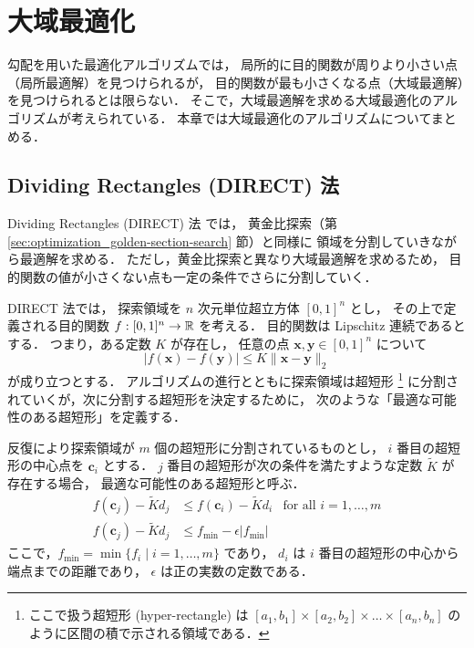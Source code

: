 %

\chapter{大域最適化}

勾配を用いた最適化アルゴリズムでは，
局所的に目的関数が周りより小さい点（局所最適解）を見つけられるが，
目的関数が最も小さくなる点（大域最適解）を見つけられるとは限らない．
そこで，大域最適解を求める大域最適化のアルゴリズムが考えられている．
本章では大域最適化のアルゴリズムについてまとめる．

\section{Dividing Rectangles (DIRECT) 法}\label{sec:optimization_direct}

Dividing Rectangles (DIRECT) 法 \cite{Jones1993} では，
黄金比探索（第 \ref{sec:optimization_golden-section-search} 節）と同様に
領域を分割していきながら最適解を求める．
ただし，黄金比探索と異なり大域最適解を求めるため，
目的関数の値が小さくない点も一定の条件でさらに分割していく．

DIRECT 法では，
探索領域を $n$ 次元単位超立方体 $[0, 1]^n$ とし，
その上で定義される目的関数 $f : [0, 1]^n \to \mathbb{R}$ を考える．
目的関数は Lipschitz 連続であるとする．
つまり，ある定数 $K$ が存在し，
任意の点 $\bm{x}, \bm{y} \in [0, 1]^n$ について
\begin{equation}
    |f(\bm{x}) - f(\bm{y})| \le K \|\bm{x} - \bm{y}\|_2
\end{equation}
が成り立つとする．
アルゴリズムの進行とともに探索領域は超短形
\footnote{ここで扱う超短形 (hyper-rectangle) は%
    $[a_1, b_1] \times [a_2, b_2] \times \ldots \times [a_n, b_n]$%
    のように区間の積で示される領域である．}
に分割されていくが，次に分割する超短形を決定するために，
次のような「最適な可能性のある超短形」を定義する．

\begin{definition}
    \label{def:optimization_direct_potentially-optimal}
    反復により探索領域が $m$ 個の超短形に分割されているものとし，
    $i$ 番目の超短形の中心点を $\bm{c}_i$ とする．
    $j$ 番目の超短形が次の条件を満たすような定数 $\tilde{K}$ が存在する場合，
    最適な可能性のある超短形と呼ぶ．
    \begin{align}
        f(\bm{c}_j) - \tilde{K} d_j & \le f(\bm{c}_i) - \tilde{K} d_i                & \text{for all $i = 1, \ldots, m$}
        \label{eq:optimization_direct_potentially-optimal_smaller-than-others}
        \\
        f(\bm{c}_j) - \tilde{K} d_j & \le f_{\text{min}} - \epsilon |f_{\text{min}}|
        \label{eq:optimization_direct_potentially-optimal_smaller-than-now}
    \end{align}
    ここで，$f_{\text{min}} = \min{\{f_i \mid i = 1, \ldots, m\}}$ であり，
    $d_i$ は $i$ 番目の超短形の中心から端点までの距離であり，
    $\epsilon$ は正の実数の定数である．
\end{definition}

